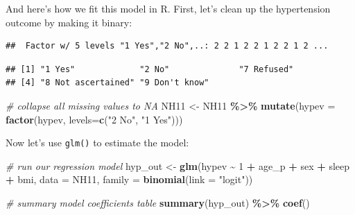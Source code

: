 \documentclass[
]{book}
\newenvironment{Shaded}{\begin{snugshade}}{\end{snugshade}}
\newcommand{\CommentTok}[1]{\textcolor[rgb]{0.56,0.35,0.01}{\textit{#1}}}
\newcommand{\DataTypeTok}[1]{\textcolor[rgb]{0.13,0.29,0.53}{#1}}
\newcommand{\DecValTok}[1]{\textcolor[rgb]{0.00,0.00,0.81}{#1}}
\newcommand{\KeywordTok}[1]{\textcolor[rgb]{0.13,0.29,0.53}{\textbf{#1}}}
\newcommand{\NormalTok}[1]{#1}
\newcommand{\OperatorTok}[1]{\textcolor[rgb]{0.81,0.36,0.00}{\textbf{#1}}}
\newcommand{\StringTok}[1]{\textcolor[rgb]{0.31,0.60,0.02}{#1}}
\begin{document}
And here's how we fit this model in R. First, let's clean up the hypertension outcome by making it binary:

\begin{Shaded}
\end{Shaded}

\begin{verbatim}
##  Factor w/ 5 levels "1 Yes","2 No",..: 2 2 1 2 2 1 2 2 1 2 ...
\end{verbatim}

\begin{Shaded}
\end{Shaded}

\begin{verbatim}
## [1] "1 Yes"             "2 No"              "7 Refused"        
## [4] "8 Not ascertained" "9 Don't know"
\end{verbatim}

\begin{Shaded}
\begin{Highlighting}[]
  \CommentTok{\# collapse all missing values to NA}
\NormalTok{  NH11 \textless{}{-}}\StringTok{ }\NormalTok{NH11 }\OperatorTok{\%\textgreater{}\%}
\StringTok{      }\KeywordTok{mutate}\NormalTok{(}\DataTypeTok{hypev =} \KeywordTok{factor}\NormalTok{(hypev, }\DataTypeTok{levels=}\KeywordTok{c}\NormalTok{(}\StringTok{"2 No"}\NormalTok{, }\StringTok{"1 Yes"}\NormalTok{)))}
\end{Highlighting}
\end{Shaded}

Now let's use \texttt{glm()} to estimate the model:

\begin{Shaded}
\begin{Highlighting}[]
  \CommentTok{\# run our regression model}
\NormalTok{  hyp\_out \textless{}{-}}\StringTok{ }\KeywordTok{glm}\NormalTok{(hypev }\OperatorTok{\textasciitilde{}}\StringTok{ }\DecValTok{1} \OperatorTok{+}\StringTok{ }\NormalTok{age\_p }\OperatorTok{+}\StringTok{ }\NormalTok{sex }\OperatorTok{+}\StringTok{ }\NormalTok{sleep }\OperatorTok{+}\StringTok{ }\NormalTok{bmi,}
                 \DataTypeTok{data =}\NormalTok{ NH11, }
                 \DataTypeTok{family =} \KeywordTok{binomial}\NormalTok{(}\DataTypeTok{link =} \StringTok{"logit"}\NormalTok{))}
  
  \CommentTok{\# summary model coefficients table}
  \KeywordTok{summary}\NormalTok{(hyp\_out) }\OperatorTok{\%\textgreater{}\%}\StringTok{ }\KeywordTok{coef}\NormalTok{()}
\end{Highlighting}
\end{Shaded}
\end{document}
